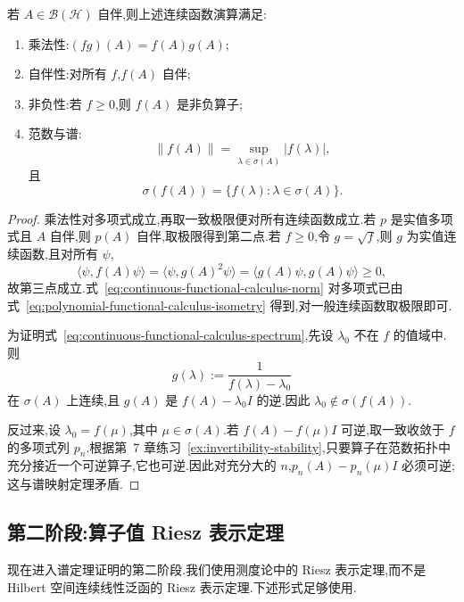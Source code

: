 \begin{proposition}[连续函数演算的性质]\label{prop:continuous-functional-calculus-properties}
若 \(A\in\mathcal{B}(\mathcal{H})\) 自伴,则上述连续函数演算满足:
\begin{enumerate}
\item 乘法性:\((fg)(A)=f(A)g(A)\);
\item 自伴性:对所有 \(f\),\(f(A)\) 自伴;
\item 非负性:若 \(f\geq0\),则 \(f(A)\) 是非负算子;
\item 范数与谱:
\[
\|f(A)\|=\sup_{\lambda\in\sigma(A)}|f(\lambda)|,
\label{eq:continuous-functional-calculus-norm}
\]
且
\[
\sigma(f(A))=\{f(\lambda):\lambda\in\sigma(A)\}.
\label{eq:continuous-functional-calculus-spectrum}
\]
\end{enumerate}
\end{proposition}

\begin{proof}
乘法性对多项式成立,再取一致极限便对所有连续函数成立.若 \(p\) 是实值多项式且 \(A\) 自伴,则 \(p(A)\) 自伴,取极限得到第二点.若 \(f\geq0\),令 \(g=\sqrt{f}\),则 \(g\) 为实值连续函数,且对所有 \(\psi\),
\[
\langle\psi,f(A)\psi\rangle
=\langle\psi,g(A)^{2}\psi\rangle
=\langle g(A)\psi,g(A)\psi\rangle\geq0,
\label{eq:nonnegative-functional-calculus}
\]
故第三点成立.式~\eqref{eq:continuous-functional-calculus-norm} 对多项式已由式~\eqref{eq:polynomial-functional-calculus-isometry} 得到,对一般连续函数取极限即可.

为证明式~\eqref{eq:continuous-functional-calculus-spectrum},先设 \(\lambda_{0}\) 不在 \(f\) 的值域中.则
\[
g(\lambda):=\frac{1}{f(\lambda)-\lambda_{0}}
\]
在 \(\sigma(A)\) 上连续,且 \(g(A)\) 是 \(f(A)-\lambda_{0}I\) 的逆.因此 \(\lambda_{0}\notin\sigma(f(A))\).

反过来,设 \(\lambda_{0}=f(\mu)\),其中 \(\mu\in\sigma(A)\).若 \(f(A)-f(\mu)I\) 可逆,取一致收敛于 \(f\) 的多项式列 \(p_{n}\).根据第~7 章练习~\ref{ex:invertibility-stability},只要算子在范数拓扑中充分接近一个可逆算子,它也可逆.因此对充分大的 \(n\),\(p_{n}(A)-p_{n}(\mu)I\) 必须可逆;这与谱映射定理矛盾.
\end{proof}

\subsection{第二阶段:算子值 Riesz 表示定理}
\label{subsec:operator-valued-riesz}

现在进入谱定理证明的第二阶段.我们使用测度论中的 Riesz 表示定理,而不是 Hilbert 空间连续线性泛函的 Riesz 表示定理.下述形式足够使用.

